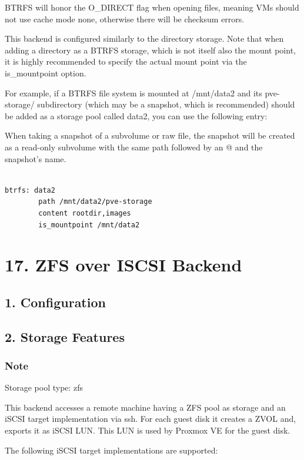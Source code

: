 BTRFS will honor the O_DIRECT flag when opening files, meaning VMs should not use cache mode none, otherwise there will be checksum errors.

This backend is configured similarly to the directory storage. Note that when adding a directory as a BTRFS storage, which is not itself also the mount point, it is highly recommended to specify the actual mount point via the is_mountpoint option.

For example, if a BTRFS file system is mounted at /mnt/data2 and its pve-storage/ subdirectory (which may be a snapshot, which is recommended) should be added as a storage pool called data2, you can use the following entry:

When taking a snapshot of a subvolume or raw file, the snapshot will be created as a read-only subvolume with the same path followed by an @ and the snapshot’s name.

\begin{lstlisting}

btrfs: data2
        path /mnt/data2/pve-storage
        content rootdir,images
        is_mountpoint /mnt/data2

\end{lstlisting}


\section{17. ZFS over ISCSI Backend}

\subsection{1. Configuration}

\subsection{2. Storage Features}

\subsubsection{Note}

Storage pool type: zfs

This backend accesses a remote machine having a ZFS pool as storage and an iSCSI target implementation via ssh. For each guest disk it creates a ZVOL and, exports it as iSCSI LUN. This LUN is used by Proxmox VE for the guest disk.

The following iSCSI target implementations are supported:

